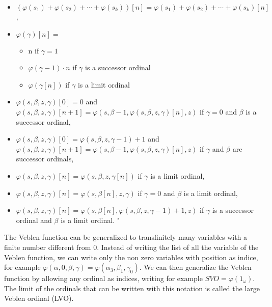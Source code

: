 \documentclass[10pt]{article}
\begin{document}
\begin{itemize}
     \setlength{\itemsep}{1pt}
     \setlength{\parskip}{0pt}
     \setlength{\parsep}{0pt}

\item \((\varphi(s_1)+\varphi(s_2)+\cdots+\varphi(s_k))[n]=\varphi(s_1)+\varphi(s_2)+\cdots+\varphi(s_k)[n]\),
\item \(\varphi(\gamma)[n]=\)
\begin{itemize}
     \setlength{\itemsep}{1pt}
     \setlength{\parskip}{0pt}
     \setlength{\parsep}{0pt}
\item n if \( \gamma=1 \)
\item \(\varphi(\gamma-1)\cdot n \) if \( \gamma \) is a successor ordinal
\item \( \varphi(\gamma[n]) \) if \( \gamma \) is a limit ordinal
\end{itemize}
\item \(\varphi(s,\beta,z,\gamma)[0]=0\) and \(\varphi(s,\beta,z,\gamma)[n+1]=\varphi(s,\beta-1,\varphi(s,\beta,z,\gamma)[n],z)\) if \(\gamma=0\) and \(\beta\) is a successor ordinal,
\item \(\varphi(s,\beta,z,\gamma)[0]=\varphi(s,\beta,z,\gamma-1)+1\) and \(\varphi(s,\beta,z,\gamma)[n+1]=\varphi(s,\beta-1,\varphi(s,\beta,z,\gamma)[n],z)\) if \(\gamma\) and \(\beta\) are successor ordinals,
\item \(\varphi(s,\beta,z,\gamma)[n]=\varphi(s,\beta,z,\gamma[n])\) if \(\gamma\) is a limit ordinal,
\item \(\varphi(s,\beta,z,\gamma)[n]=\varphi(s,\beta[n],z,\gamma)\) if \(\gamma=0\) and \(\beta\) is a limit ordinal,
\item \(\varphi(s,\beta,z,\gamma)[n]=\varphi(s,\beta[n],\varphi(s,\beta,z,\gamma-1)+1,z)\) if \(\gamma\) is a successor ordinal and \(\beta\) is a limit ordinal. "

\end{itemize}

The Veblen function can be generalized to transfinitely many variables with a finite number different from 0. Instead of writing the list of all the variable of the Veblen function, we can write only the non zero variables with position as indice, for example \( \varphi(\alpha,0,\beta,\gamma) = \varphi(\alpha_3,\beta_1,\gamma_0) \). We can then generalize the Veblen function by allowing any ordinal as indices, writing for example \( SVO = \varphi(1_\omega) \). The limit of the ordinals that can be written with this notation is called the large Veblen ordinal (LVO).
\end{document}

